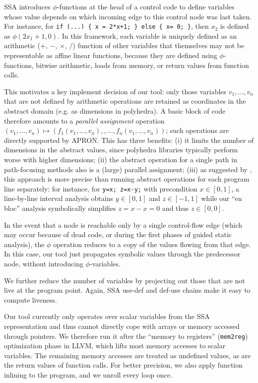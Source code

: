 \documentclass[preprint]{sigplanconf}
\begin{document}
SSA introduces $\phi$-functions at the head of a control code to define variables whose value depends on which incoming edge to this control node was last taken. For instance, for \lstinline|if (...) { x = 2*x+1; } else { x= 0; }|, then $x_2$ is defined as $\phi(2x_1+1,0)$. In this framework, each variable is uniquely defined as an arithmetic ($+$, $-$, $\times$, $/$) function of other variables that themselves may not be representable as affine linear functions, because they are defined using $\phi$-functions, bitwise arithmetic, loads from memory, or return values from function calls.

This motivates a key implement decision of our tool: only those variables $v_1,\dots,v_n$ that are not defined by arithmetic operations are retained as coordinates in the abstract domain (e.g. as dimensions in polyhedra). A basic block of code therefore amounts to a \emph{parallel assignment} operation
$(v_1,\dots,v_n) \allowbreak\mapsto\allowbreak
(f_1(v_1,\dots,v_n), \allowbreak, \dots, \allowbreak
 f_n(v_1,\dots,v_n))$;
such operations are directly supported by APRON. This has three benefits:
(i) it limits the number of dimensions in the abstract values, since polyhedra libraries typically perform worse with higher dimensions;
(ii) the abstract operation for a single path in path-focusing methods also is a (large) parallel assignment;
(iii) as suggested by \citet{DBLP:conf/vmcai/Mine06}, this approach is more precise than running abstract operations for each program line separately:
for instance, for \lstinline|y=x; z=x-y;| with precondition $x \in [0,1]$, a line-by-line interval analysis obtains $y \in [0,1]$ and $z \in [-1,1]$ while our ``en bloc'' analysis symbolically simplifies $z = x - x = 0$ and thus $z \in [0,0]$.

In the event that a node is reachable only by a single control-flow edge (which may occur because of dead code, or during the first phases of guided static analysis), the $\phi$ operation reduces to a copy of the values flowing from that edge. In this case, our tool just propagates symbolic values through the predecessor node, without introducing $\phi$-variables.

We further reduce the number of variables by projecting out those that are not live at the program point. Again, SSA use-def and def-use chains make it easy to compute liveness.

Our tool currently only operates over scalar variables from the SSA representation and thus cannot directly cope with arrays or memory accessed through pointers. We therefore run it after the ``memory to registers'' (\texttt{mem2reg}) optimization phase in LLVM, which lifts most memory accesses to scalar variables.
The remaining memory accesses are treated as undefined values, as are the return
values of function calls. For better precision, we also apply function inlining
to the program, and we unroll every loop once.
\end{document}
